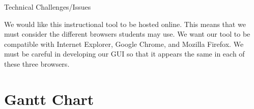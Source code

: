 \documentclass[letterpaper, 10pt,titlepage]{article}
\begin{document}
\begin{section}{Technical Challenges/Issues}


We would like this instructional tool to be hosted online. This means that we must consider the different browsers students may use. We want our tool to be compatible with Internet Explorer, Google Chrome, and Mozilla Firefox. We must be careful in developing our GUI so that it appears the same in each of these three browsers.


\bigbreak
\bigbreak
\bigbreak
\end{section}






\section{Gantt Chart}
\end{document}
